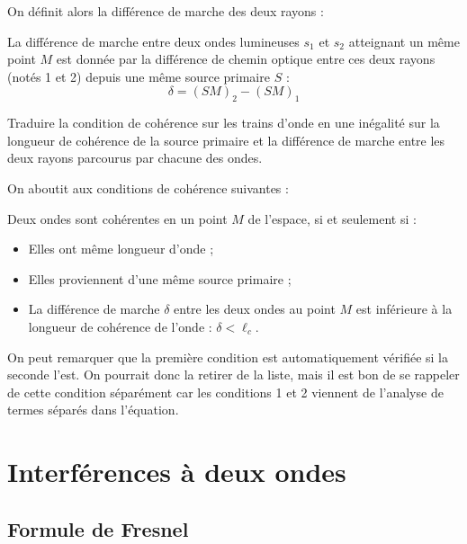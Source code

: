 \documentclass[11pt,fleqn]{book} %
\begin{document}
On définit alors la différence de marche des deux rayons :
\begin{definition}
	La différence de marche entre deux ondes lumineuses $s_1$ et $s_2$ atteignant un même point $M$ est donnée par la différence de chemin optique entre ces deux rayons (notés 1 et 2) depuis une même source primaire $S$ :
	\begin{equation}
		\delta = (SM)_2 - (SM)_1
	\end{equation}
\end{definition}

\begin{capex}
Traduire la condition de cohérence sur les trains d'onde en une inégalité sur la longueur de cohérence de la source primaire et la différence de marche entre les deux rayons parcourus par chacune des ondes.
\end{capex}

On aboutit aux conditions de cohérence suivantes :
\begin{proposition}
Deux ondes sont cohérentes en un point $M$ de l'espace, si et seulement si :
\begin{itemize}
	\item Elles ont même longueur d'onde ;
	\item Elles proviennent d'une même source primaire ;
	\item La différence de marche $\delta$ entre les deux ondes au point $M$ est inférieure à la longueur de cohérence de l'onde : $\delta < \ell_c$. 
\end{itemize}
\end{proposition}
\begin{remark}
	On peut remarquer que la première condition est automatiquement vérifiée si la seconde l'est. On pourrait donc la retirer de la liste, mais il est bon de se rappeler de cette condition séparément car les conditions 1 et 2 viennent de l'analyse de termes séparés dans l'équation.
\end{remark}

\section{Interférences à deux ondes}

\subsection{Formule de Fresnel}
\end{document}
